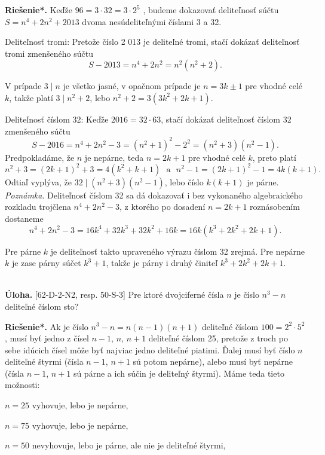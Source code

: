 \documentclass[11pt,a4paper,oneside,final]{book}
\newcommand{\ul}{\textbf{Úloha.} }
\newcommand{\rieh}{\textbf{Riešenie*.} }
\begin{document}
\rieh Keďže $96 = 3 \cdot 32 = 3 \cdot 2^5$ , budeme dokazovať deliteľnosť súčtu $S = n^4 + 2n^2 + 2 013$ dvoma nesúdeliteľnými číslami 3 a 32.

Deliteľnosť tromi: Pretože číslo 2 013 je deliteľné tromi, stačí dokázať deliteľnosť tromi zmenšeného súčtu
$$S - 2 013 = n^4+ 2n^2= n^2(n^2+ 2).$$

V prípade $3 \mid n$ je všetko jasné, v opačnom prípade je $n = 3k \pm 1$ pre vhodné celé $k$, takže platí $3 \mid n^2 + 2$, lebo $n^2 + 2 = 3(3k^2 + 2k + 1)$.

Deliteľnosť číslom 32: Keďže $2 016 = 32 \cdot 63$, stačí dokázať deliteľnosť číslom 32 zmenšeného súčtu
$$S - 2 016 = n^4+ 2n^2 - 3 = (n^2+ 1)^2 - 2^2= (n^2+ 3)(n^2 - 1).$$
Predpokladáme, že $n$ je nepárne, teda $n = 2k + 1$ pre vhodné celé $k$, preto platí
$$n^2+ 3 = (2k + 1)^2+ 3 = 4(k^2+ k + 1) \ \ \ \text{a} \ \ \ n^2 - 1 = (2k + 1)^2 - 1 = 4k(k + 1).$$
Odtiaľ vyplýva, že $32 \mid (n^2 + 3)(n^2 - 1)$, lebo číslo $k(k + 1)$ je párne.\\
\textit{Poznámka}. Deliteľnosť číslom 32 sa dá dokazovať i bez vykonaného algebraického rozkladu trojčlena $n^4 + 2n^2 - 3$, z ktorého po dosadení $n = 2k + 1$ roznásobením dostaneme
$$n^4+ 2n^2 - 3 = 16k^4+ 32k^3+ 32k^2+ 16k = 16k(k^3
+ 2k^2+ 2k + 1).$$

Pre párne $k$ je deliteľnosť takto upraveného výrazu číslom 32 zrejmá. Pre nepárne $k$ je zase párny súčet $k^3 + 1$, takže je párny i druhý činiteľ $k^3 + 2k^2 + 2k + 1$.\\
\\
\begin{tcolorbox}[breakable,notitle,boxrule=0pt,colback=light-gray,colframe=light-gray]\ul [62-D-2-N2, resp. 50-S-3] Pre ktoré dvojciferné čísla $n$ je číslo $n^3 - n$ deliteľné číslom sto?

\end{tcolorbox}

\rieh Ak je číslo $n^3-n = n(n-1)(n + 1)$ deliteľné číslom $100 = 2^2 \cdot 5^2$, musí byť jedno z čísel $n-1$, $n$, $n + 1$ deliteľné číslom 25, pretože z troch po sebe idúcich čísel môže byť najviac jedno deliteľné piatimi. Ďalej musí byť číslo $n$ deliteľné štyrmi (čísla $n-1$, $n + 1$ sú potom nepárne), alebo musí byť nepárne (čísla $n-1$, $n + 1$ sú párne a ich súčin je deliteľný štyrmi). Máme teda tieto možnosti:

$n = 25$ vyhovuje, lebo je nepárne,

$n = 75$ vyhovuje, lebo je nepárne,

$n = 50$ nevyhovuje, lebo je párne, ale nie je deliteľné štyrmi,
\end{document}
